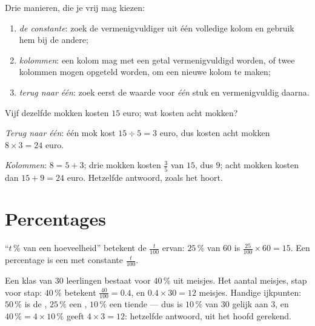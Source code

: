 \begin{method}\label{met:g6:propdata:complete}
Drie manieren, die je vrij mag kiezen:
\begin{enumerate}
  \item \emph{de constante}: zoek de vermenigvuldiger uit één volledige kolom en
        gebruik hem bij de andere;
  \item \emph{kolommen}: een kolom mag met een getal vermenigvuldigd worden, of
        twee kolommen mogen opgeteld worden, om een nieuwe kolom te maken;
  \item \emph{terug naar één}: zoek eerst de waarde voor \emph{één} stuk en
        vermenigvuldig daarna.
\end{enumerate}
\end{method}

\begin{example}\label{ex:g6:propdata:methods}
Vijf dezelfde mokken kosten $15$ euro; wat kosten acht mokken?

\emph{Terug naar één}: één mok kost $15 \div 5 = 3$ euro, dus kosten acht mokken
$8 \times 3 = 24$ euro.

\emph{Kolommen}: $8 = 5 + 3$; drie mokken kosten $\frac{3}{5}$ van $15$, dus
$9$; acht mokken kosten dan $15 + 9 = 24$ euro. Hetzelfde antwoord, zoals het
hoort.
\end{example}

\section{Percentages}

\begin{definition}[Percentage]\label{def:g6:propdata:percent}
``$t\,\%$ van een hoeveelheid'' betekent de  $\frac{t}{100}$ ervan:
$25\,\%$ van $60$ is $\frac{25}{100} \times 60 = 15$. Een percentage is een
 met constante $\frac{t}{100}$.
\end{definition}

\begin{example}\label{ex:g6:propdata:percent}
Een klas van $30$ leerlingen bestaat voor $40\,\%$ uit meisjes. Het aantal
meisjes, stap voor stap: $40\,\%$ betekent $\frac{40}{100} = 0.4$, en
$0.4 \times 30 = 12$ meisjes. Handige ijkpunten: $50\,\%$ is de , $25\,\%$
een , $10\,\%$ een tiende --- dus is $10\,\%$ van $30$ gelijk aan $3$, en
$40\,\% = 4 \times 10\,\%$ geeft $4 \times 3 = 12$: hetzelfde antwoord, uit het
hoofd gerekend.
\end{example}

